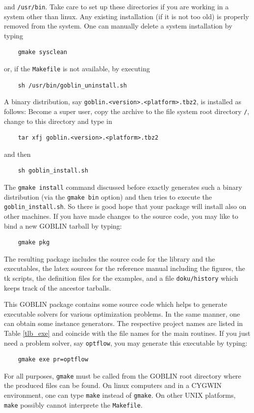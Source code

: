 \documentclass[a4paper,11pt,twoside]{book}
\begin{document}
\begin{multicols}{2}
and \verb!/usr/bin!. Take care to set up these directories if you are working
in a system other than linux. Any existing installation (if it is not too old)
is properly removed from the system. One can manually delete a system
installation by typing
\begin{verbatim}
    gmake sysclean
\end{verbatim}
or, if the \verb/Makefile/ is not available, by executing
\begin{verbatim}
    sh /usr/bin/goblin_uninstall.sh
\end{verbatim}
A binary distribution, say \verb/goblin.<version>.<platform>.tbz2/, is installed
as follows: Become a super user, copy the archive to the file system root
directory \verb!/!, change to this directory and type in
\begin{verbatim}
    tar xfj goblin.<version>.<platform>.tbz2
\end{verbatim}
and then
\begin{verbatim}
    sh goblin_install.sh
\end{verbatim}
The \verb/gmake install/ command discussed before exactly generates such a
binary distribution (via the \verb/gmake bin/ option) and then tries to
execute the \verb/goblin_install.sh/. So there is good hope that your package
will install also on other machines. If you have made changes to the source
code, you may like to bind a new GOBLIN tarball by typing:
\begin{verbatim}
    gmake pkg
\end{verbatim}
The resulting package includes the source code for the library and the
executables, the latex sources for the reference manual including the figures,
the tk scripts, the definition files for the examples, and a file
\verb!doku/history! which keeps track of the ancestor tarballs.

This GOBLIN package contains some source code which helps to generate
executable solvers for various optimization problems. In the same manner,
one can obtain some instance generators. The respective project names are
listed in Table \ref{tlb_exe} and coincide with the
file names for the main routines. If you just need a problem solver,
say \verb/optflow/, you may generate this executable by typing:
\begin{verbatim}
    gmake exe pr=optflow
\end{verbatim}
For all purposes, \verb/gmake/ must be called from the GOBLIN root directory
where the produced files can be found. On linux computers and in a CYGWIN
environment, one can type \verb/make/ instead of \verb/gmake/. On other UNIX
platforms, \verb/make/ possibly cannot interprete the \verb/Makefile/.



\end{multicols}
\end{document}
